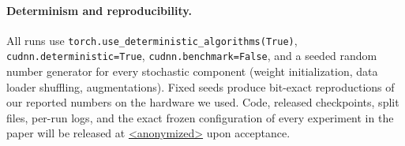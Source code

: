 \paragraph{Determinism and reproducibility.} All runs use \texttt{torch.use\_deterministic\_algorithms(True)}, \texttt{cudnn.deterministic=True}, \texttt{cudnn.benchmark=False}, and a seeded random number generator for every stochastic component (weight initialization, data loader shuffling, augmentations). Fixed seeds produce bit-exact reproductions of our reported numbers on the hardware we used. Code, released checkpoints, split files, per-run logs, and the exact frozen configuration of every experiment in the paper will be released at \url{<anonymized>} upon acceptance.
